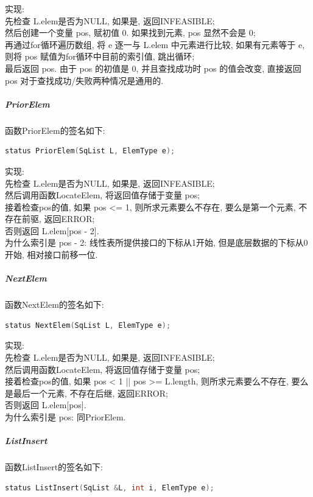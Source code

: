 \documentclass[supercite]{Experimental_Report}
\theoremstyle{definition}
\begin{document}
\noindent
实现: \\
先检查 L.elem是否为NULL, 如果是, 返回INFEASIBLE; \\
然后创建一个变量 pos, 赋初值 0. 如果找到元素, pos 显然不会是 0; \\
再通过for循环遍历数组, 将 e 逐一与 L.elem 中元素进行比较, 如果有元素等于 e, 则将 pos 赋值为for循环中目前的索引值, 跳出循环; \\
最后返回 pos. 由于 pos 的初值是 0, 并且查找成功时 pos 的值会改变, 直接返回 pos 对于查找成功/失败两种情况是通用的.\\

\subparagraph{PriorElem}
\noindent
函数PriorElem的签名如下:
\begin{lstlisting}[language=C++, frame=single]
status PriorElem(SqList L, ElemType e);
\end{lstlisting}

\noindent
实现: \\
先检查 L.elem是否为NULL, 如果是, 返回INFEASIBLE; \\
然后调用函数LocateElem, 将返回值存储于变量 pos; \\
接着检查pos的值, 如果 pos <= 1, 则所求元素要么不存在, 要么是第一个元素, 不存在前驱, 返回ERROR; \\
否则返回 L.elem[pos - 2]. \\
为什么索引是 pos - 2: 线性表所提供接口的下标从1开始, 但是底层数据的下标从0开始, 相对接口前移一位.\\

\subparagraph{NextElem}
\noindent
函数NextElem的签名如下:
\begin{lstlisting}[language=C++, frame=single]
status NextElem(SqList L, ElemType e);
\end{lstlisting}

\noindent
实现: \\
先检查 L.elem是否为NULL, 如果是, 返回INFEASIBLE; \\
然后调用函数LocateElem, 将返回值存储于变量 pos; \\
接着检查pos的值, 如果 pos < 1 || pos >= L.length, 则所求元素要么不存在, 要么是最后一个元素, 不存在后继, 返回ERROR; \\
否则返回 L.elem[pos]. \\
为什么索引是 pos: 同PriorElem.\\

\subparagraph{ListInsert}
\noindent
函数ListInsert的签名如下:
\begin{lstlisting}[language=C++, frame=single]
status ListInsert(SqList &L, int i, ElemType e);
\end{lstlisting}
\end{document}
